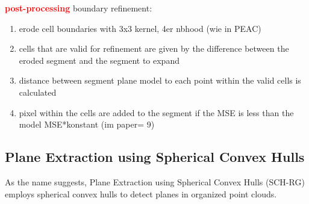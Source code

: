 \documentclass[main.tex]{subfiles}
\begin{document}
\textbf{\textcolor{red}{post-processing}}
boundary refinement:
\begin{enumerate}
    \item erode cell boundaries with 3x3 kernel, 4er nbhood (wie in PEAC)
    \item cells that are valid for refinement are given by the difference between the eroded segment and the segment to expand
    \item distance between segment plane model to each point within the valid cells is calculated
    \item pixel within the cells are added to the segment if the MSE is less than the model MSE*konstant (im paper= 9)
\end{enumerate}


\subsection{Plane Extraction using Spherical Convex Hulls}
As the name suggests, Plane Extraction using Spherical Convex Hulls (SCH-RG) employs spherical convex hulls to detect planes in organized point clouds.
\end{document}
